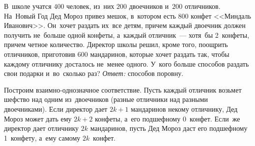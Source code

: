\problem
В~школе учатся $400$ человек, из~них $200$ двоечников и~$200$ отличников.
На~Новый Год Дед Мороз привез мешок, в~котором есть 800 конфет
<<Миндаль Иванович>>.
Он~хочет раздать их~все детям, причем каждый двоечник должен получить не~больше
одной конфеты, а~каждый отличник~--- хотя~бы 2~конфеты, причем четное
количество.
Директор школы решил, кроме того, поощрить отличников, приготовив
600 мандаринов, которые хочет раздать так, чтобы каждому отличнику досталось
не~менее одного.
У~кого больше способов раздать свои подарки и~во~сколько раз?
\solution
\emph{Ответ:} способов поровну.
\par
Построим взаимно-однозначное соответствие.
Пусть каждый отличник возьмет шефство над одним из~двоечников
(разные отличники над разными двоечниками).
Если директор дает $2 k + 1$ мандаринов некому отличнику, Дед Мороз может дать
ему $2 k + 2$ конфеты, а~его подшефному 0~конфет.
Если~же директор дает отличнику $2 k$ мандаринов, пусть Дед Мороз даст его
подшефному 1~конфету, а~ему самому $2 k$~конфет. 
\endproblem
